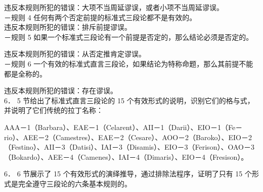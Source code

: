 违反本规则所犯的错误：大项不当周延谬误，或者小项不当周延谬误。\\
－规则 4 任何有两个否定前提的标准式三段论都不是有效的。\\
违反本规则所犯的错误：排斥前提谬误。\\
－规则 5 如果一个标准式三段论有一个前提是否定的，那么结论必须是否定的。

违反本规则所犯的错误：从否定推肯定谬误。\\
－规则 6 一个有效的标准式直言三段论，如果结论为特称命题，那么其前提不能都是全称的。

违反本规则所犯的错误：存在谬误。\\
6． 5 节给出了标准式直言三段论的 15 个有效形式的说明，识别它们的格与式，并说明了它们传统的拉丁名称：

AAA－1（Barbara）、EAE－1（Celarent）、AII－1（Darii）、EIO－1（Fe－ rio）、AEE－2（Camestres）、EAE－2（Cesare）、AOO－2（Baroko）、EIO－2\\
（Festino）、AII－3（Datisi）、IAI－3（Disamis）、EIO－3（Ferison）、OAO－3 （Bokardo）、AEE－4（Camenes）、IAI－4（Dimaris）、EIO－4（Fresison）。

6． 6 节展示了 15 个有效形式的演绎推导，通过排除法程序，证明了只有 15 个形式是完全遵守三段论的六条基本规则的。


